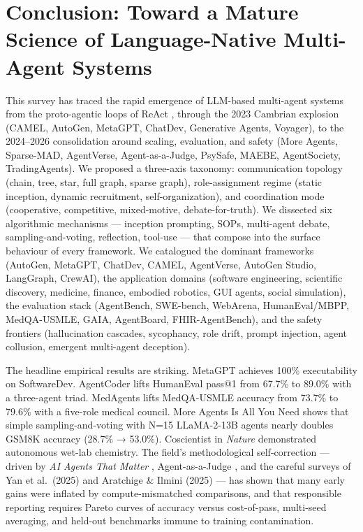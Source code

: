 \documentclass{article}
\begin{document}
\section{Conclusion: Toward a Mature Science of Language-Native Multi-Agent Systems}\label{conclusion-toward-a-mature-science-of-language-native-multi-agent-systems}

This survey has traced the rapid emergence of LLM-based multi-agent systems from the proto-agentic loops of ReAct \citep{yao2023reactsynergizingre}, through the 2023 Cambrian explosion (CAMEL, AutoGen, MetaGPT, ChatDev, Generative Agents, Voyager), to the 2024--2026 consolidation around scaling, evaluation, and safety (More Agents, Sparse-MAD, AgentVerse, Agent-as-a-Judge, PsySafe, MAEBE, AgentSociety, TradingAgents). We proposed a three-axis taxonomy: communication topology (chain, tree, star, full graph, sparse graph), role-assignment regime (static inception, dynamic recruitment, self-organization), and coordination mode (cooperative, competitive, mixed-motive, debate-for-truth). We dissected six algorithmic mechanisms --- inception prompting, SOPs, multi-agent debate, sampling-and-voting, reflection, tool-use --- that compose into the surface behaviour of every framework. We catalogued the dominant frameworks (AutoGen, MetaGPT, ChatDev, CAMEL, AgentVerse, AutoGen Studio, LangGraph, CrewAI), the application domains (software engineering, scientific discovery, medicine, finance, embodied robotics, GUI agents, social simulation), the evaluation stack (AgentBench, SWE-bench, WebArena, HumanEval/MBPP, MedQA-USMLE, GAIA, AgentBoard, FHIR-AgentBench), and the safety frontiers (hallucination cascades, sycophancy, role drift, prompt injection, agent collusion, emergent multi-agent deception).

The headline empirical results are striking. MetaGPT achieves 100\% executability on SoftwareDev. AgentCoder lifts HumanEval pass@1 from 67.7\% to 89.0\% with a three-agent triad. MedAgents lifts MedQA-USMLE accuracy from 73.7\% to 79.6\% with a five-role medical council. More Agents Is All You Need shows that simple sampling-and-voting with N=15 LLaMA-2-13B agents nearly doubles GSM8K accuracy (28.7\% → 53.0\%). Coscientist in \emph{Nature} demonstrated autonomous wet-lab chemistry. The field's methodological self-correction --- driven by \emph{AI Agents That Matter} \citep{kapoor2024aiagentsthatmatter}, Agent-as-a-Judge \citep{zhuge20242024}, and the careful surveys of Yan et al.~(2025) and Aratchige \& Ilmini (2025) --- has shown that many early gains were inflated by compute-mismatched comparisons, and that responsible reporting requires Pareto curves of accuracy versus cost-of-pass, multi-seed averaging, and held-out benchmarks immune to training contamination.
\end{document}
